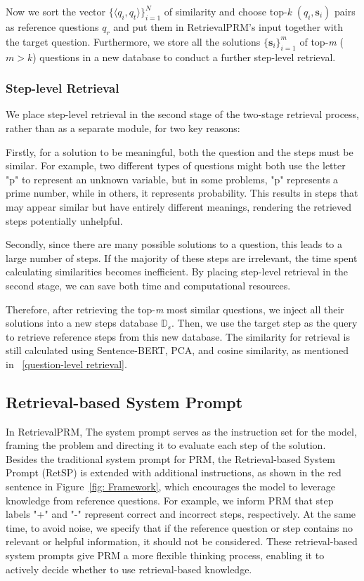 Now we sort the vector $\{\langle q_i,q_t\rangle\}_{i=1}^N$ of similarity and choose top-\textit{k} $(q_i,\mathbf{s}_i)$ pairs as reference questions $q_r$ and put them in RetrievalPRM's input together with the target question. Furthermore, we store all the solutions $\{\mathbf{s}_i\}_{i=1}^{m}$ of top-\textit{m} ($m>k$) questions in a new database to conduct a further step-level retrieval. 

\subsubsection{Step-level Retrieval}

We place step-level retrieval in the second stage of the two-stage retrieval process, rather than as a separate module, for two key reasons:

Firstly, for a solution to be meaningful, both the question and the steps must be similar. For example, two different types of questions might both use the letter "p" to represent an unknown variable, but in some problems, "p" represents a prime number, while in others, it represents probability. This results in steps that may appear similar but have entirely different meanings, rendering the retrieved steps potentially unhelpful.

Secondly, since there are many possible solutions to a question, this leads to a large number of steps. If the majority of these steps are irrelevant, the time spent calculating similarities becomes inefficient. By placing step-level retrieval in the second stage, we can save both time and computational resources.

Therefore, after retrieving the top-\textit{m} most similar questions, we inject all their solutions into a new steps database $\mathbb{D}_s$. Then, we use the target step as the query to retrieve reference steps from this new database. The similarity for retrieval is still calculated using Sentence-BERT, PCA, and cosine similarity, as mentioned in ~\ref{question-level retrieval}.


\subsection{Retrieval-based System Prompt}
In RetrievalPRM,  The system prompt serves as the instruction set for the model, framing the problem and directing it to evaluate each step of the solution.
Besides the traditional system prompt for PRM, the Retrieval-based System Prompt (RetSP) is extended with additional instructions, as shown in the red sentence in Figure~\ref{fig: Framework}, which encourages the model to leverage knowledge from reference questions. For example, we inform PRM that step labels "+" and "-" represent correct and incorrect steps, respectively. At the same time, to avoid noise, we specify that if the reference question or step contains no relevant or helpful information, it should not be considered. These retrieval-based system prompts give PRM a more flexible thinking process, enabling it to actively decide whether to use retrieval-based knowledge.

